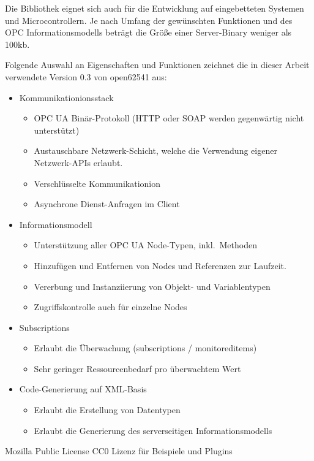 Die Bibliothek eignet sich auch für die Entwicklung auf eingebetteten Systemen und
Microcontrollern. Je nach Umfang der gewünschten Funktionen und des OPC Informationsmodells
beträgt die Größe einer Server-Binary weniger als 100kb. %


Folgende Auswahl an Eigenschaften und Funktionen zeichnet die in dieser Arbeit verwendete
Version 0.3 von open62541 aus:
\begin{itemize}
  \item Kommunikationionsstack
  \begin{itemize}
      \item OPC UA Binär-Protokoll (HTTP oder SOAP werden gegenwärtig nicht unterstützt)
      \item Austauschbare Netzwerk-Schicht, welche die Verwendung eigener Netzwerk-APIs
      erlaubt.
      \item Verschlüsselte Kommunikationion
      \item Asynchrone Dienst-Anfragen im Client
  \end{itemize}
  \item Informationsmodell
  \begin{itemize}
    \item Unterstützung aller OPC UA Node-Typen, inkl.~Methoden
    \item Hinzufügen und Entfernen von Nodes und Referenzen zur Laufzeit.
    \item Vererbung und Instanziierung von Objekt- und Variablentypen
    \item Zugriffskontrolle auch für einzelne Nodes
  \end{itemize}
  \item Subscriptions
  \begin{itemize}
    \item Erlaubt die Überwachung (subscriptions / monitoreditems)
    \item Sehr geringer Ressourcenbedarf pro überwachtem Wert
  \end{itemize}
  \item Code-Generierung auf XML-Basis
  \begin{itemize}
    \item Erlaubt die Erstellung von Datentypen
    \item Erlaubt die Generierung des serverseitigen Informationsmodells
  \end{itemize}
\end{itemize}



Mozilla Public License
CC0 Lizenz für Beispiele und Plugins

